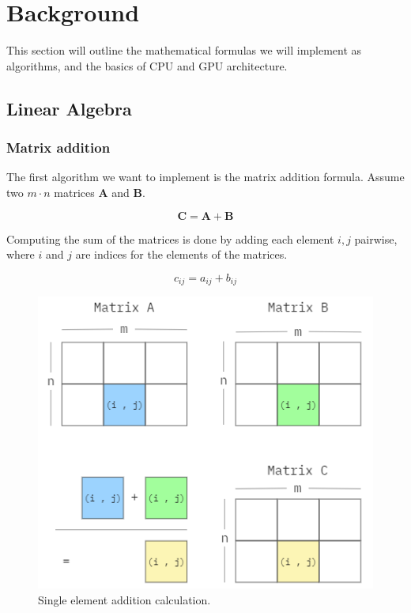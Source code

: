 \section{Background} \label{sect:backgroundw}

This section will outline the mathematical formulas we will implement as algorithms, and the basics of CPU and GPU architecture.

\subsection{Linear Algebra}

\subsubsection{Matrix addition}

The first algorithm we want to implement is the matrix addition formula. Assume two \(m \cdot n\) matrices \(\mathbf{A}\) and \(\mathbf{B}\). 

\[\mathbf{C} = \mathbf{A} + \mathbf{B}\]

Computing the sum of the matrices is done by adding each element \(i,j\) pairwise, where \(i\) and \(j\) are indices for the elements of the matrices.

\[c_{ij} = a_{ij} + b_{ij}\]

\begin{figure}[H]
\includegraphics[scale=.65]{Documents/Report/Figures/MatrixAddition.png}
\centering
\caption{Single element addition calculation.}
\label{fig:addition_illustration}
\end{figure}

